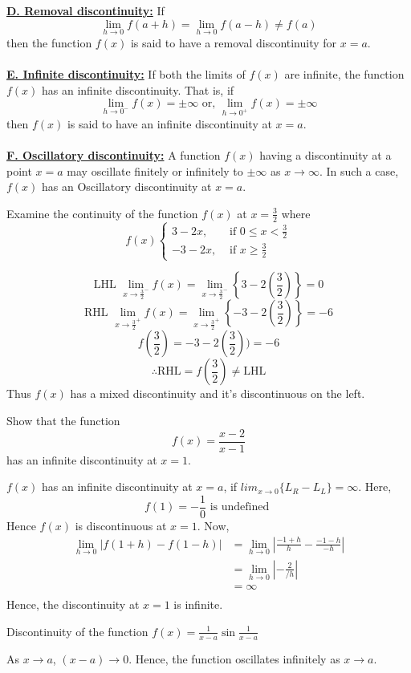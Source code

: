 \underline{\textbf{D. Removal discontinuity:}}
If \[
    \lim_{h \to 0} f(a+h) = \lim_{h \to 0} f(a-h) \neq f(a)
\] then the function $f(x)$ is said to have a removal discontinuity for $x=a$. \\~\\

\underline{\textbf{E. Infinite discontinuity:}}
If both the limits of $f(x)$ are infinite, the function $f(x)$ has an infinite discontinuity. That is, if \[
    \lim_{h \to 0^-} f(x) = \pm \infty \text{ or, } \lim_{h \to 0^+} f(x) = \pm \infty
\] then $f(x)$ is said to have an infinite discontinuity at $x=a$. \\~\\

\underline{\textbf{F. Oscillatory discontinuity:}}
A function $f(x)$ having a discontinuity at a point $x=a$ may oscillate finitely or infinitely to $\pm \infty$ as $x \to \infty$. In such a case, $f(x)$ has an Oscillatory discontinuity at $x=a$.

\begin{example}{Examine the continuity of the function $f(x)$ at $x=\frac{3}{2}$ where 
    \begin{equation*}
        f(x)
        \begin{cases}
            3-2x, &\text{ if } 0 \le x < \frac{3}{2} \\
            -3-2x, & \text{ if } x \ge \frac{3}{2}
        \end{cases}
    \end{equation*}
    }
    
    \[ \text{LHL } \lim_{x \to \frac{3}{2}^-} f(x) = \lim_{x \to \frac{3}{2}^-} \left\{ 3-2 \left( \frac{3}{2} \right) \right\} = 0 \]
    \[ \text{RHL } \lim_{x \to \frac{3}{2}^+} f(x) = \lim_{x \to \frac{3}{2}^+} \left\{ -3-2 \left( \frac{3}{2} \right) \right\} = -6 \]
    \[ f \left( \frac{3}{2} \right) = -3-2 \left( \frac{3}{2} \right)) = -6 \]
    \[ \therefore \text{RHL} = f\left(\frac{3}{2}\right) \neq \text{LHL} \]
    Thus $f(x)$ has a mixed discontinuity and it's discontinuous on the left.
\end{example}

\begin{example}{Show that the function \[
    f(x) = \frac{x-2}{x-1}
\] has an infinite discontinuity at $x=1$.}
    
    $f(x)$ has an infinite discontinuity at $x=a$, if \(lim_{x \to 0} \{ L_R - L_L \} = \infty\). Here,
    \[ f(1) = -\frac{1}{0} \text{ is undefined } \] Hence $f(x)$ is discontinuous at $x=1$. Now,
    \begin{align*}
        \lim_{h \to 0} \left| f(1+h) - f(1-h) \right| &= \lim_{h \to 0} \left| \frac{-1+h}{h} - \frac{-1-h}{-h} \right| \\
        &= \lim_{h \to 0} \left| -\frac{2}{/h} \right| \\
        &= \infty \\
    \end{align*}
    Hence, the discontinuity at $x=1$ is infinite.
\end{example}

\begin{example}{Discontinuity of the function $f(x) = \frac{1}{x-a}\sin{\frac{1}{x-a}}$}
    
    As $x \to a$, $(x-a) \to 0$. Hence, the function oscillates infinitely as $x \to a$.
\end{example}
